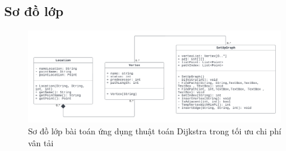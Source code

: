 \documentclass[a4paper]{article}
\begin{document}
\subsection{Sơ đồ lớp}

\begin{figure}[!ht]
    \centering
    \includegraphics[width=17cm]{diagram.png}
    \caption{Sơ đồ lớp bài toán ứng dụng thuật toán Dijkstra trong tối ưu chi phí vân tải}
    \label{fig:my_label}
\end{figure}
\end{document}
